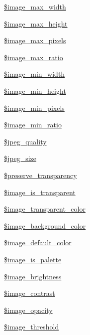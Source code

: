 \begin{DoxyCompactItemize}
\hyperlink{classupload_a14f3e3202be224af25bcbc555a781f65}{\$image\+\_\+max\+\_\+width}
\item 
\hyperlink{classupload_a2df1b5d7d09a11b0587742f5f2d786ee}{\$image\+\_\+max\+\_\+height}
\item 
\hyperlink{classupload_abc795bfddebcf253c2d0d64a64a399fe}{\$image\+\_\+max\+\_\+pixels}
\item 
\hyperlink{classupload_a66e79fcd550ad74e6b6517df2661909d}{\$image\+\_\+max\+\_\+ratio}
\item 
\hyperlink{classupload_a322568e4c30725d9ea521d45c857c4dd}{\$image\+\_\+min\+\_\+width}
\item 
\hyperlink{classupload_a985f264fbd648934034dee35af689f8d}{\$image\+\_\+min\+\_\+height}
\item 
\hyperlink{classupload_a284709d2afa0a2d1c36d1cd808e7ae1b}{\$image\+\_\+min\+\_\+pixels}
\item 
\hyperlink{classupload_a388039e7342104f9edc159409621cc26}{\$image\+\_\+min\+\_\+ratio}
\item 
\hyperlink{classupload_a90ffe63797caadbc62bbe8a9b8f66ebc}{\$jpeg\+\_\+quality}
\item 
\hyperlink{classupload_a06b59e47fb2fc04e86cae3c2e2fe7606}{\$jpeg\+\_\+size}
\item 
\hyperlink{classupload_ae3203a32ccf32ef9aef83a10ca3ac6c8}{\$preserve\+\_\+transparency}
\item 
\hyperlink{classupload_a63282e847d7bb4cc5cafe6f3e13947e7}{\$image\+\_\+is\+\_\+transparent}
\item 
\hyperlink{classupload_abd51165c532232b024e27993dd3b71e7}{\$image\+\_\+transparent\+\_\+color}
\item 
\hyperlink{classupload_ae423140b8727badf53053d86ee283238}{\$image\+\_\+background\+\_\+color}
\item 
\hyperlink{classupload_a1d6eefeead6a00d5cbaf5d2a1febf250}{\$image\+\_\+default\+\_\+color}
\item 
\hyperlink{classupload_a9a07e7cf68f937d0893e03a2203f241b}{\$image\+\_\+is\+\_\+palette}
\item 
\hyperlink{classupload_ab281e2f35a5721a1b6e211afa44b6451}{\$image\+\_\+brightness}
\item 
\hyperlink{classupload_ae2ea321b0485389561bbf167ce5ceb80}{\$image\+\_\+contrast}
\item 
\hyperlink{classupload_a208a3d3afb2fcbae0570ac1a98da56ab}{\$image\+\_\+opacity}
\item 
\hyperlink{classupload_a0bc844d9152080be9d3ba9216f36f22b}{\$image\+\_\+threshold}

\end{DoxyCompactItemize}
